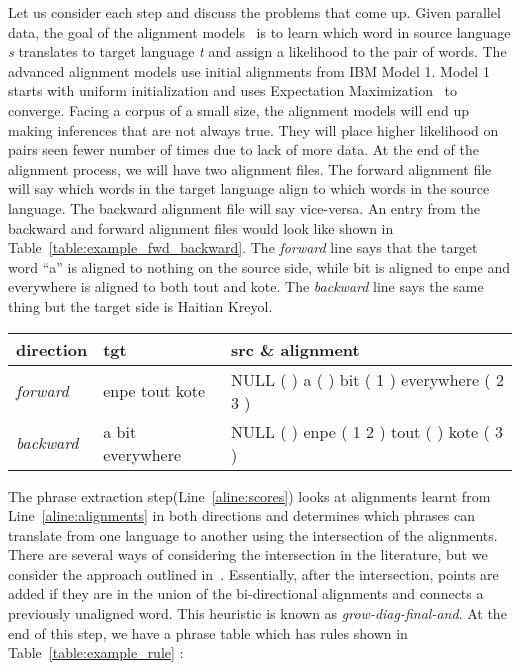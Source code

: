 Let us consider each step and discuss the problems that come up. Given parallel data, the goal of the alignment models~\cite{Brown:1993,Vogel:1996} is to learn which word in source language \emph{s} translates to target language \emph{t} and assign a likelihood to the pair of words. The advanced alignment models use initial alignments from IBM Model 1. Model 1 starts with uniform initialization and uses Expectation Maximization~\cite{Dempster:77} to converge. Facing a corpus of a small size, the alignment models will end up making inferences that are not always true. They will place higher likelihood on pairs seen fewer number of times due to lack of more data. At the end of the alignment process, we will have two alignment files. The forward alignment file will say which words in the target language align to which words in the source language. The backward alignment file will say vice-versa. An entry from the backward and forward alignment files would look like shown in Table~\ref{table:example_fwd_backward}. The \emph{forward} line says that the target word ``a'' is aligned to nothing on the source side, while bit is aligned to enpe and everywhere is aligned to both tout and kote. The \emph{backward} line says the same thing but the target side is Haitian Kreyol. 

\begin{table*}
\small
\small
\begin{tabular}{lp{}p{}}
\toprule
direction & tgt & src \& alignment \\
\toprule
\emph{forward} & enpe tout kote & NULL ({ }) a ({ }) bit ({ 1 }) everywhere ({ 2 3 })  \\
\emph{backward} & a bit everywhere & NULL ({ }) enpe ({ 1 2 }) tout ({ }) kote ({ 3 }) \\
\bottomrule
\end{tabular}
\caption{Example of a forward and backward alignment}
\label{table:example_fwd_backward}
\end{table*}


The phrase extraction step(Line~\ref{aline:scores}) looks at alignments learnt from Line~\ref{aline:alignments} in both directions and determines which phrases can translate from one language to another using the intersection of the alignments. There are several ways of considering the intersection in the literature, but we consider the approach outlined in~\cite{Koehn:03}. Essentially, after the intersection, points are added if they are in the union of the bi-directional alignments and connects a previously unaligned word. This heuristic is known as \emph{grow-diag-final-and}. At the end of this step, we have a phrase table which has rules shown in Table~\ref{table:example_rule} : 

